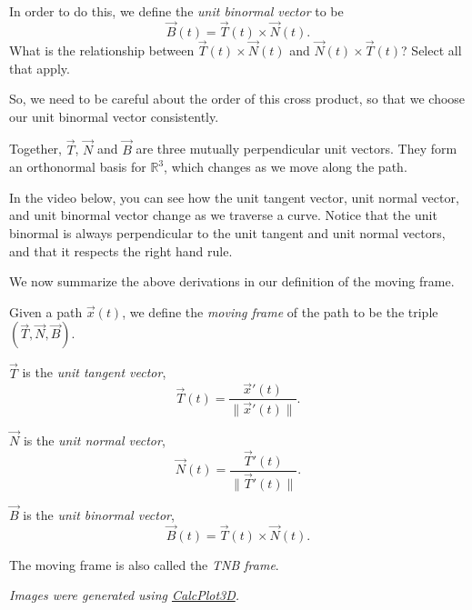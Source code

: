\documentclass{ximera}
\begin{document}
In order to do this, we define the \emph{unit binormal vector} to be
\[
\vec{B}(t) = \vec{T}(t)\times\vec{N}(t).
\]
What is the relationship between $\vec{T}(t)\times\vec{N}(t)$ and $\vec{N}(t)\times\vec{T}(t)$? Select all that apply.
\begin{selectAll}
\end{selectAll}
So, we need to be careful about the order of this cross product, so that we choose our unit binormal vector consistently.

Together, $\vec{T}$, $\vec{N}$ and $\vec{B}$ are three mutually perpendicular unit vectors. They form an orthonormal basis for $\mathbb{R}^3$, which changes as we move along the path.

In the video below, you can see how the unit tangent vector, unit normal vector, and unit binormal vector change as we traverse a curve. Notice that the unit binormal is always perpendicular to the unit tangent and unit normal vectors, and that it respects the right hand rule.


We now summarize the above derivations in our definition of the moving frame.

\begin{definition}
Given a path $\vec{x}(t)$, we define the \emph{moving frame} of the path to be the triple $(\vec{T},\vec{N},\vec{B})$.

$\vec{T}$ is the \emph{unit tangent vector},
\[
\vec{T}(t) = \dfrac{\vec{x}'(t)}{\|\vec{x}'(t)\|}.
\]

$\vec{N}$ is the \emph{unit normal vector},
\[
\vec{N}(t) = \dfrac{\vec{T}'(t)}{\|\vec{T}'(t)\|}.
\]

$\vec{B}$ is the \emph{unit binormal vector},
\[
\vec{B}(t) = \vec{T}(t)\times\vec{N}(t).
\] 

The moving frame is also called the \emph{TNB frame}.
\end{definition}

\textit{Images were generated using \href{https://www.monroecc.edu/faculty/paulseeburger/calcnsf/CalcPlot3D/}{CalcPlot3D}.}
\end{document}
